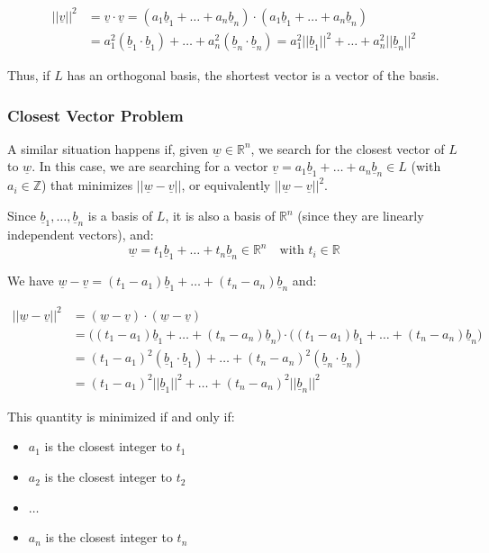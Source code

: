 \begin{align*}
||\underline{v}||^2 &= \underline{v} \cdot \underline{v} = (a_1\underline{b}_1 + \dots + a_n\underline{b}_n) \cdot (a_1\underline{b}_1 + \dots + a_n\underline{b}_n) \\
&= a_1^2(\underline{b}_1 \cdot \underline{b}_1) + \dots + a_n^2(\underline{b}_n \cdot \underline{b}_n) = a_1^2||\underline{b}_1||^2 + \dots + a_n^2||\underline{b}_n||^2
\end{align*}

\noindent
Thus, if $L$ has an orthogonal basis, the shortest vector is a vector of the basis.

\subsubsection*{Closest Vector Problem}

A similar situation happens if, given $\underline{w} \in \mathbb{R}^n$, we search for the closest vector of $L$ to $\underline{w}$. In this case, we are searching for a vector $\underline{v} = a_1\underline{b}_1 + \dots + a_n\underline{b}_n \in L$ (with $a_i \in \mathbb{Z}$) that minimizes $||\underline{w} - \underline{v}||$, or equivalently $||\underline{w} - \underline{v}||^2$.
\medskip

\noindent
Since $\underline{b}_1, \dots, \underline{b}_n$ is a basis of $L$, it is also a basis of $\mathbb{R}^n$ (since they are linearly independent vectors), and:
\[ \underline{w} = t_1\underline{b}_1 + \dots + t_n\underline{b}_n \in \mathbb{R}^n \quad \text{with } t_i \in \mathbb{R} \]
\medskip

\noindent
We have $\underline{w} - \underline{v} = (t_1 - a_1)\underline{b}_1 + \dots + (t_n - a_n)\underline{b}_n$ and:

\begin{align*}
||\underline{w} - \underline{v}||^2 &= (\underline{w} - \underline{v}) \cdot (\underline{w} - \underline{v}) \\
&= \big((t_1 - a_1)\underline{b}_1 + \dots + (t_n - a_n)\underline{b}_n\big) \cdot \big((t_1 - a_1)\underline{b}_1 + \dots + (t_n - a_n)\underline{b}_n\big) \\
&= (t_1 - a_1)^2(\underline{b}_1 \cdot \underline{b}_1) + \dots + (t_n - a_n)^2(\underline{b}_n \cdot \underline{b}_n) \\
&= (t_1 - a_1)^2||\underline{b}_1||^2 + \dots + (t_n - a_n)^2||\underline{b}_n||^2
\end{align*}

\noindent
This quantity is minimized if and only if:
\begin{itemize}
    \item $a_1$ is the closest integer to $t_1$
    \item $a_2$ is the closest integer to $t_2$
    \item $\dots$
    \item $a_n$ is the closest integer to $t_n$
\end{itemize}

